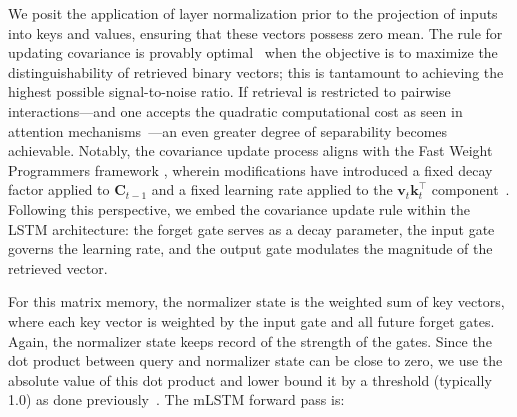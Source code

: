 We posit the application of layer normalization prior to the projection of inputs into keys and values, ensuring that these vectors possess zero mean. The rule for updating covariance is provably optimal~\citep{Dayan:91} when the objective is to maximize the distinguishability of retrieved binary vectors; this is tantamount to achieving the highest possible signal-to-noise ratio. If retrieval is restricted to pairwise interactions—and one accepts the quadratic computational cost as seen in attention mechanisms~\citep{Krotov:16,Krotov:17,Ramsauer:21}—an even greater degree of separability becomes achievable. Notably, the covariance update process aligns with the Fast Weight Programmers framework \citep{Schmidhuber:92ncfastweights,Schlag:21}, wherein modifications have introduced a fixed decay factor applied to $\mathbf{C}_{t-1}$ and a fixed learning rate applied to the 
$\mathbf{v}_{t} \mathbf{k}_t ^\top$ component~\citep{Ba:16}. Following this perspective, we embed the covariance update rule within the LSTM architecture: the forget gate serves as a decay parameter, the input gate governs the learning rate, and the output gate modulates the magnitude of the retrieved vector.

For this matrix memory, the normalizer state is the weighted sum of key vectors, where each key vector is weighted by the input gate and all future forget gates. Again, the normalizer state keeps record of the strength of the gates. Since the dot product between query and normalizer state can be close to zero, we use the absolute value of this dot product and lower bound it by a threshold (typically 1.0) as done previously~\citep{Sun:23arxiv}. The mLSTM forward pass is:

